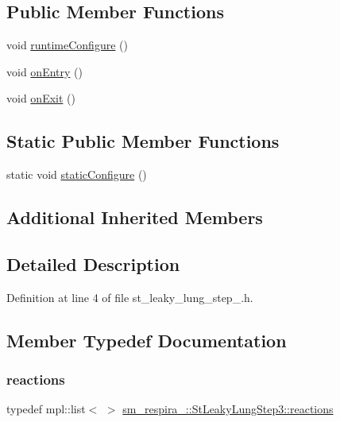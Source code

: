 \subsection*{Public Member Functions}
\begin{DoxyCompactItemize}
\item 
void \hyperlink{structsm__respira__1_1_1StLeakyLungStep3_abea67094aaff8b69c96f478914165c8f}{runtime\+Configure} ()
\item 
void \hyperlink{structsm__respira__1_1_1StLeakyLungStep3_a3e1a20f54d35bc8d6a8add4a7815907e}{on\+Entry} ()
\item 
void \hyperlink{structsm__respira__1_1_1StLeakyLungStep3_ae10c075f4084328d4b17c918225ab7d1}{on\+Exit} ()
\end{DoxyCompactItemize}
\subsection*{Static Public Member Functions}
\begin{DoxyCompactItemize}
\item 
static void \hyperlink{structsm__respira__1_1_1StLeakyLungStep3_a43d0e0d80ec8436ff14252691ab19a83}{static\+Configure} ()
\end{DoxyCompactItemize}
\subsection*{Additional Inherited Members}


\subsection{Detailed Description}


Definition at line 4 of file st\+\_\+leaky\+\_\+lung\+\_\+step\+\_.\+h.



\subsection{Member Typedef Documentation}
\mbox{\label{structsm__respira__1_1_1StLeakyLungStep3_a5f16ee57548be4a1487c0dc6c9965737}} 
\subsubsection{\texorpdfstring{reactions}{reactions}}
{\footnotesize\ttfamily typedef mpl\+::list$<$ $>$ \hyperlink{structsm__respira__1_1_1StLeakyLungStep3_a5f16ee57548be4a1487c0dc6c9965737}{sm\+\_\+respira\+\_\+::\+St\+Leaky\+Lung\+Step3\+::reactions}}



